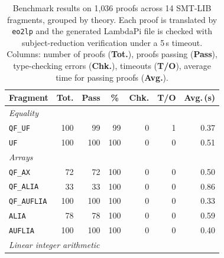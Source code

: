 \begin{table}[t]
	\centering
	\caption{Benchmark results on 1{,}036  proofs across 14 SMT-LIB
		fragments, grouped by theory.
		Each proof is translated by \texttt{eo2lp} and the generated
		LambdaPi file is checked with subject-reduction verification
		under a 5\,s timeout.
		Columns: number of proofs (\textbf{Tot.}),
		proofs passing (\textbf{Pass}),
		type-checking errors (\textbf{Chk.}),
		timeouts (\textbf{T/O}),
		average time for passing proofs (\textbf{Avg.}).}
	\label{tab:results}
	\begin{tabular}{l r r r r r r}
		\hline
		Fragment                 & Tot.             & Pass             & \multicolumn{1}{c}{\%} & Chk.        & T/O         & Avg.\,(s)     \\
		\hline
		\multicolumn{7}{l}{\textit{Equality}}                                                                                               \\
		\quad\texttt{QF\_UF}     & 100              & 99               & 99                     & 0           & 1           & 0.37          \\
		\quad\texttt{UF}         & 100              & 100              & 100                    & 0           & 0           & 0.51          \\[3pt]
		\multicolumn{7}{l}{\textit{Arrays}}                                                                                                 \\
		\quad\texttt{QF\_AX}     & 72               & 72               & 100                    & 0           & 0           & 0.50          \\
		\quad\texttt{QF\_ALIA}   & 33               & 33               & 100                    & 0           & 0           & 0.86          \\
		\quad\texttt{QF\_AUFLIA} & 100              & 100              & 100                    & 0           & 0           & 0.33          \\
		\quad\texttt{ALIA}       & 78               & 78               & 100                    & 0           & 0           & 0.59          \\
		\quad\texttt{AUFLIA}     & 100              & 100              & 100                    & 0           & 0           & 0.40          \\[3pt]
		\multicolumn{7}{l}{\textit{Linear integer arithmetic}}                                                                              \\

\end{tabular}
\end{table}
